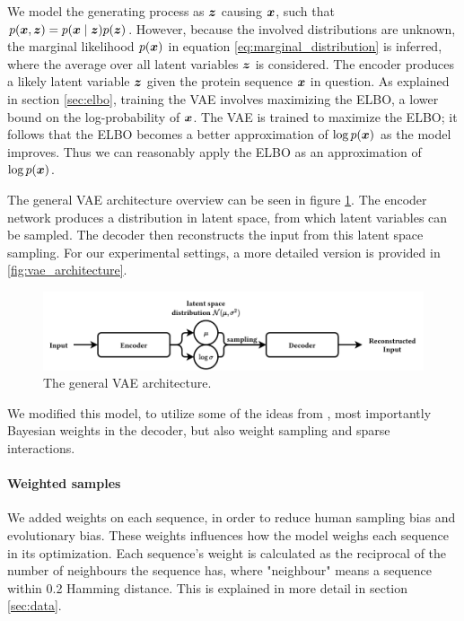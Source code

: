 We model the generating process as $\bm{ z }$ causing $\bm{ x }$, such that $p{\mathopen{} \left( \bm{ x }, \bm{ z } \right) \mathclose{}} = p(\bm{ x } \mid \bm{ z }) p(\bm{ z })$.
However, because the involved distributions are unknown, the marginal likelihood $p(\bm{ x })$ in equation \ref{eq:marginal_distribution} is inferred, where the average over all latent variables $\bm{ z }$ is considered. The encoder produces a likely latent variable $\bm{ z }$ given the protein sequence $\bm{ x }$ in question. As explained in section \ref{sec:elbo}, training the VAE involves maximizing the ELBO, a lower bound on the log-probability of $\bm{ x }$. The VAE is trained to maximize the ELBO; it follows that the ELBO becomes a better approximation of $\log p(\bm{ x })$ as the model improves. Thus we can reasonably apply the ELBO as an approximation of $\log p(\bm{ x })$.

The general VAE architecture overview can be seen in figure \ref{fig:general_vae}. The encoder network produces a distribution in latent space, from which latent variables can be sampled. The decoder then reconstructs the input from this latent space sampling. For our experimental settings, a more detailed version is provided in \ref{fig:vae_architecture}. 
\begin{figure}[H]
    \centering
    \includegraphics[width = \linewidth]{report/figures/general_vae.pdf}
    \caption{The general VAE architecture.}
    \label{fig:general_vae}
\end{figure}
We modified this model, to utilize some of the ideas from \textcite{riesselman2018deep}, most importantly Bayesian weights in the decoder, but also weight sampling and sparse interactions.

\paragraph{Weighted samples} We added weights on each sequence, in order to reduce human sampling bias and evolutionary bias. These weights influences how the model weighs each sequence in its optimization. Each sequence's weight is calculated as the reciprocal of the number of neighbours the sequence has, where "neighbour" means a sequence within 0.2 Hamming distance. This is explained in more detail in section \ref{sec:data}.

